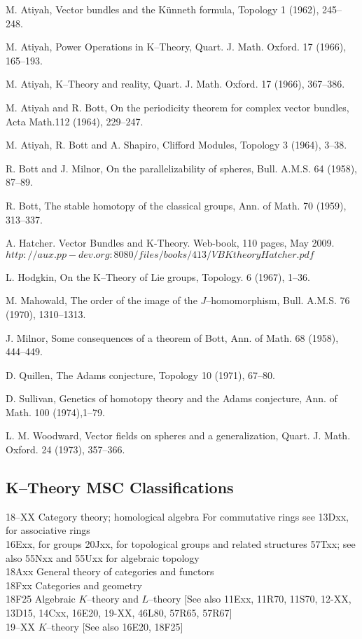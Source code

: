 \documentclass[12pt]{article}
\theoremstyle{plain}
\theoremstyle{definition}
\numberwithin{equation}{section}
\begin{document}
M. Atiyah, Vector bundles and the K\"unneth formula, Topology 1 (1962), 245--248.

M. Atiyah, Power Operations in K--Theory, Quart. J. Math. Oxford. 17 (1966), 
165--193.

M. Atiyah, K--Theory and reality, Quart. J. Math. Oxford. 17 (1966), 367--386.

M. Atiyah and R. Bott, On the periodicity theorem for complex vector bundles, Acta Math.112 (1964), 229--247.

M. Atiyah, R. Bott and A. Shapiro, Clifford Modules, Topology 3 (1964), 3--38.

R. Bott and J. Milnor, On the parallelizability of spheres, Bull. A.M.S. 64 (1958), 87--89.

R. Bott, The stable homotopy of the classical groups, Ann. of Math. 70 (1959), 313--337.

A. Hatcher. Vector Bundles and K-Theory. Web-book, 110 pages, May 2009. $http://aux.pp-dev.org:8080/files/books/413/VBKtheoryHatcher.pdf$

L. Hodgkin, On the K--Theory of Lie groups, Topology. 6 (1967), 1--36.

M. Mahowald, The order of the image of the $J$--homomorphism, Bull. A.M.S. 76 (1970), 1310--1313.


J. Milnor, Some consequences of a theorem of Bott, Ann. of Math. 68 (1958), 
444--449.

D. Quillen, The Adams conjecture, Topology 10 (1971), 67--80.

D. Sullivan, Genetics of homotopy theory and the Adams conjecture, Ann. of Math. 100 (1974),1--79.

L. M. Woodward, Vector fields on spheres and a generalization, Quart. J. Math. Oxford. 24 (1973), 357--366.

\subsection{K--Theory MSC Classifications}

18--XX                   Category theory; homological algebra For commutative rings see 13Dxx, for associative rings \\ 
16Exx, for groups 20Jxx, for topological groups and related structures 57Txx; see also 55Nxx and 55Uxx for algebraic  topology \\
18Axx           General theory of categories and functors\\
18Fxx           Categories and geometry\\
18F25   Algebraic $K$--theory and $L$--theory [See also 11Exx, 11R70, 11S70, 12-XX, 13D15, 14Cxx, 16E20, 19-XX, 46L80, 57R65, 57R67]\\
19--XX                   $K$--theory [See also 16E20, 18F25]\\
\end{document}
